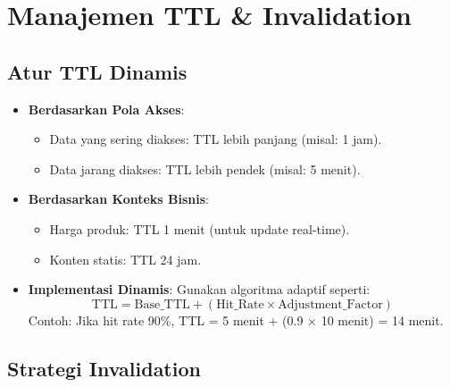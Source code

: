 \documentclass[11pt, a4paper]{book}
\begin{document}
	\section{Manajemen TTL \& Invalidation}
	\label{sec:ttl-invalidation}
	
	\subsection{Atur TTL Dinamis}
	\label{subsec:ttl-dinamis}
	
	\begin{itemize}
		\item \textbf{Berdasarkan Pola Akses}:  
		\begin{itemize}
			\item Data yang sering diakses: TTL lebih panjang (misal: 1 jam).  
			\item Data jarang diakses: TTL lebih pendek (misal: 5 menit).  
		\end{itemize}
		
		\item \textbf{Berdasarkan Konteks Bisnis}:  
		\begin{itemize}
			\item Harga produk: TTL 1 menit (untuk update real-time).  
			\item Konten statis: TTL 24 jam.  
		\end{itemize}
		
		\item \textbf{Implementasi Dinamis}:  
		Gunakan algoritma adaptif seperti:  
		\[
		\mathrm{TTL} = \mathrm{Base\_TTL} + (\mathrm{Hit\_Rate} \times \mathrm{Adjustment\_Factor})
		\]
		Contoh: Jika hit rate 90\%, TTL = 5 menit + (0.9 × 10 menit) = 14 menit.
	\end{itemize}
	
	\subsection{Strategi Invalidation}
	\label{subsec:strategi-invalidation}
	
\end{document}
